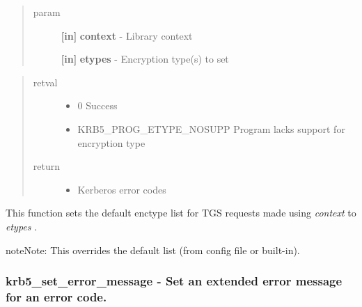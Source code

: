 \documentclass[letterpaper,10pt,english]{sphinxmanual}
\begin{document}
\begin{fulllineitems}
\label{appdev/refs/api/krb5_set_default_tgs_enctypes:krb5_set_default_tgs_enctypes}
\end{fulllineitems}

\begin{quote}\begin{description}
\item[{param}] \leavevmode
\textbf{{[}in{]}} \textbf{context} - Library context

\textbf{{[}in{]}} \textbf{etypes} - Encryption type(s) to set

\end{description}\end{quote}
\begin{quote}\begin{description}
\item[{retval}] \leavevmode\begin{itemize}
\item {} 
0   Success

\item {} 
KRB5\_PROG\_ETYPE\_NOSUPP   Program lacks support for encryption type

\end{itemize}

\item[{return}] \leavevmode\begin{itemize}
\item {} 
Kerberos error codes

\end{itemize}

\end{description}\end{quote}

This function sets the default enctype list for TGS requests made using \emph{context} to \emph{etypes} .

\begin{notice}{note}{Note:}
This overrides the default list (from config file or built-in).
\end{notice}


\subsubsection{krb5\_set\_error\_message -  Set an extended error message for an error code.}
\label{appdev/refs/api/krb5_set_error_message::doc}\label{appdev/refs/api/krb5_set_error_message:krb5-set-error-message-set-an-extended-error-message-for-an-error-code}
\end{document}
